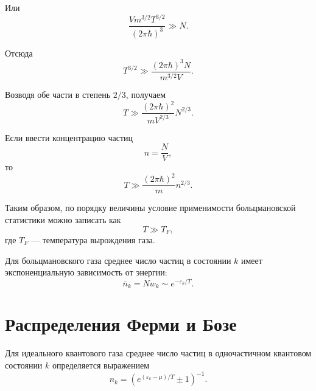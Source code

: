 \documentclass[../final.tex]{subfiles}
\begin{document}
Или
%
\begin{equation*}
    \frac{
        V m^{3/2}T^{3/2}
    }{
        (2\pi\hbar)^3
    }
    \gg
    N.
\end{equation*}

Отсюда
%
\begin{equation*}
    T^{3/2}
    \gg
    \frac{
        (2\pi\hbar)^3N
    }{
        m^{3/2}V
    }.
\end{equation*}

Возводя обе части в степень $2/3$, получаем
%
\begin{equation*}
    T
    \gg
    \frac{
        (2\pi\hbar)^2
    }{
        mV^{2/3}
    }
    N^{2/3}.
\end{equation*}

Если ввести концентрацию частиц
%
\begin{equation*}
    n
    =
    \frac{N}{V},
\end{equation*}
%
то
%
\begin{equation*}
    T
    \gg
    \frac{
        (2\pi\hbar)^2
    }{
        m
    }
    n^{2/3}.
\end{equation*}

Таким образом, по порядку величины условие применимости
больцмановской статистики можно записать как
%
\begin{equation*}
    T
    \gg
    T_F,
\end{equation*}
%
где $T_F$ --- температура вырождения газа.

Для больцмановского газа среднее число частиц в состоянии $k$
имеет экспоненциальную зависимость от энергии:
%
\begin{equation*}
    \overline{n}_k
    =
    Nw_k
    \sim
    e^{-\varepsilon_k/T}.
\end{equation*}



\section*{Распределения Ферми и Бозе}

Для идеального квантового газа среднее число частиц
в одночастичном квантовом состоянии $k$ определяется выражением
%
\begin{equation*}
    n_k
    =
    \left(
        e^{(\varepsilon_k-\mu)/T}
        \pm 1
    \right)^{-1}.
\end{equation*}
\end{document}
